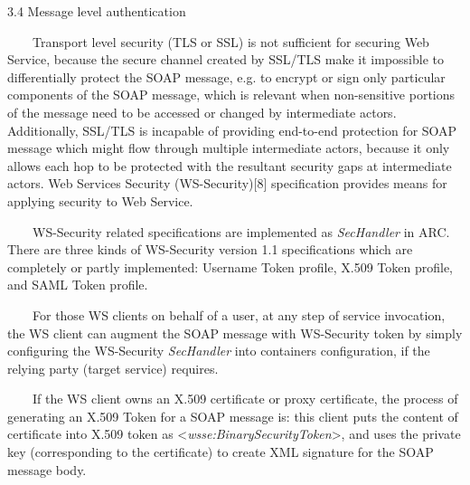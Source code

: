 \documentclass{article}
\begin{document}
3.4 Message level authentication

\ \ \ \ Transport level security (TLS or SSL) is not sufficient for
securing Web Service, because the secure channel created by SSL/TLS
make it impossible to differentially protect the SOAP message, e.g. to
encrypt or sign only particular components of the SOAP message, which
is relevant when non-sensitive portions of the message need to be
accessed or changed by intermediate actors. Additionally, SSL/TLS is
incapable of providing end-to-end protection for SOAP message which
might flow through multiple intermediate actors, because it only allows
each hop to be protected with the resultant security gaps at
intermediate actors. Web Services Security (WS-Security)[8]
specification provides means for applying security to Web Service.

\ \ \ \ WS-Security related specifications are implemented as
\textit{SecHandler} in ARC. There are three kinds of WS-Security
version 1.1 specifications which are completely or partly implemented:
Username Token profile, X.509 Token profile, and SAML Token profile.

\ \ \ \ For those WS clients on behalf of a user, at any step of service
invocation, the WS client can augment the SOAP message with WS-Security
token by simply configuring the WS-Security \textit{SecHandler} into
container{\textquotesingle}s configuration, if the relying party
(target service) requires.

\ \ \ \ If the WS client owns an X.509 certificate or proxy certificate,
the process of generating an X.509 Token for a SOAP message is: this
client puts the content of certificate into X.509 token as
{\textless}\textit{wsse:BinarySecurityToken}{\textgreater}, and uses
the private key (corresponding to the certificate) to create XML
signature for the SOAP message body.
\end{document}
